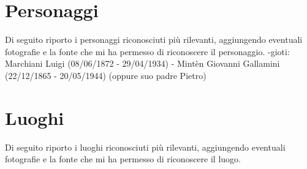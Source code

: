 \documentclass[10pt]{memoir} %
\begin{document}

\label{Personaggi}
\chapter*{Personaggi}
Di seguito riporto i personaggi riconosciuti più rilevanti, aggiungendo eventuali fotografie e la fonte che mi ha permesso di riconoscere il personaggio.
-gioti: Marchiani Luigi (08/06/1872 - 29/04/1934)
- Mintèn Giovanni Gallamini (22/12/1865 - 20/05/1944) (oppure suo padre Pietro)
\renewcommand{\indexname}{Indice dei Personaggi}
\printindex[Personaggi]

\label{Luoghi}
\chapter*{Luoghi}
Di seguito riporto i luoghi riconosciuti più rilevanti, aggiungendo eventuali fotografie e la fonte che mi ha permesso di riconoscere il luogo.
\renewcommand{\indexname}{Indice dei Luoghi}
\printindex[Luoghi]




\end{document}
